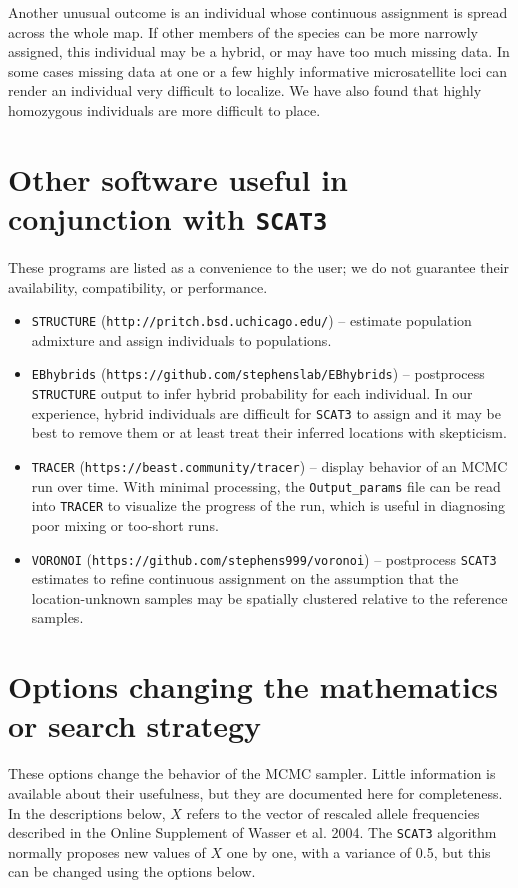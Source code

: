 \documentclass[10pt,titlepage,times,letterpaper]{article}
\def\SCAT{{\tt SCAT3} }
\begin{document}
Another unusual outcome is an individual whose continuous assignment is
spread across the whole map.  If other members of the species can be more
narrowly assigned, this individual may be a hybrid, or may have too much
missing data.  In some cases missing data at one or a few highly informative
microsatellite loci can render an individual very difficult to localize.
We have also found that highly homozygous individuals are more difficult
to place.

\section{Other software useful in conjunction with \SCAT} \label{software}

These programs are listed as a convenience to the user; we do not
guarantee their availability, compatibility, or performance.

\begin{itemize}
\item {\tt STRUCTURE} ({\tt http://pritch.bsd.uchicago.edu/}) -- estimate
population admixture and assign individuals to populations.
\item {\tt EBhybrids} ({\tt https://github.com/stephenslab/EBhybrids}) -- 
postprocess {\tt STRUCTURE} output to infer hybrid probability for each 
individual.  In our experience, hybrid individuals are difficult for \SCAT 
to assign and it may be best to remove them or at least treat their
inferred locations with skepticism.
\item {\tt TRACER} ({\tt https://beast.community/tracer}) -- display behavior
of an MCMC run over time.  With minimal processing, the {\tt Output\_params}
file can be read into {\tt TRACER} to visualize the progress of the run,
which is useful in diagnosing poor mixing or too-short runs.
\item {\tt VORONOI} ({\tt https://github.com/stephens999/voronoi}) --
postprocess \SCAT estimates to refine continuous assignment on the
assumption that the location-unknown samples may be spatially clustered
relative to the reference samples.
\end{itemize}

\section{Options changing the mathematics or search strategy}

These options change the behavior of the MCMC sampler.  Little information
is available about their usefulness, but they
are documented here for completeness.  In the descriptions below, $X$ refers
to the vector of rescaled allele frequencies described in the
Online Supplement of Wasser et al. 2004.  The \SCAT algorithm normally
proposes new values of $X$ one by one, with a variance of 0.5, but
this can be changed using the options below.
\end{document}
